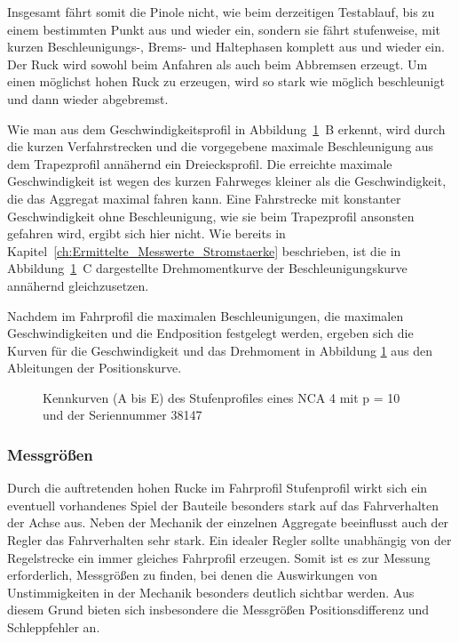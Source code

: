 Insgesamt fährt somit die Pinole nicht, wie beim derzeitigen Testablauf, bis zu einem bestimmten Punkt aus und wieder ein, sondern sie fährt stufenweise, mit kurzen Beschleunigungs-, Brems- und Haltephasen komplett aus und wieder ein. Der Ruck wird sowohl beim Anfahren als auch beim Abbremsen erzeugt.
Um einen möglichst hohen Ruck zu erzeugen, wird so stark wie möglich beschleunigt und dann wieder abgebremst. 

Wie man aus dem Geschwindigkeitsprofil in Abbildung~\ref{fig:Axiales Spiel NCA 4 mit p = 10 und der Seriennummer 38147}~B erkennt, wird durch die kurzen Verfahrstrecken und die vorgegebene maximale Beschleunigung aus dem Trapezprofil annähernd ein Dreiecksprofil. Die erreichte maximale Geschwindigkeit ist wegen des kurzen Fahrweges kleiner als die Geschwindigkeit, die das Aggregat maximal fahren kann. Eine Fahrstrecke mit konstanter Geschwindigkeit ohne Beschleunigung, wie sie beim Trapezprofil ansonsten gefahren wird, ergibt sich hier nicht. Wie bereits in Kapitel~\ref{ch:Ermittelte_Messwerte_Stromstaerke} beschrieben, ist die in Abbildung~\ref{fig:Axiales Spiel NCA 4 mit p = 10 und der Seriennummer 38147}~C dargestellte Drehmomentkurve der Beschleunigungskurve annähernd gleichzusetzen. 


Nachdem im Fahrprofil die maximalen Beschleunigungen, die maximalen Geschwindigkeiten und die Endposition festgelegt werden, ergeben sich die Kurven für die Geschwindigkeit und das Drehmoment in Abbildung \ref{fig:Axiales Spiel NCA 4 mit p = 10 und der Seriennummer 38147} aus den Ableitungen der Positionskurve.

\clearpage

\begin{figure}[H]
\centering

\caption{Kennkurven (A bis E) des Stufenprofiles eines  NCA 4 mit p = 10 und der Seriennummer 38147}
\label{fig:Axiales Spiel NCA 4 mit p = 10 und der Seriennummer 38147}
\end{figure}


\subsubsection{Messgrößen}\label{cha: Messgroessen Stufenprofil}


Durch die auftretenden hohen Rucke im Fahrprofil Stufenprofil wirkt sich ein eventuell vorhandenes Spiel der Bauteile besonders stark auf das Fahrverhalten der Achse aus. Neben der Mechanik der einzelnen Aggregate beeinflusst auch der Regler das Fahrverhalten sehr stark. Ein idealer Regler sollte unabhängig von der Regelstrecke ein immer gleiches Fahrprofil erzeugen. Somit ist es zur Messung erforderlich, Messgrößen zu finden, bei denen die Auswirkungen von Unstimmigkeiten in der Mechanik besonders deutlich sichtbar werden. Aus diesem Grund bieten sich insbesondere die  Messgrößen Positionsdifferenz und Schleppfehler an.

